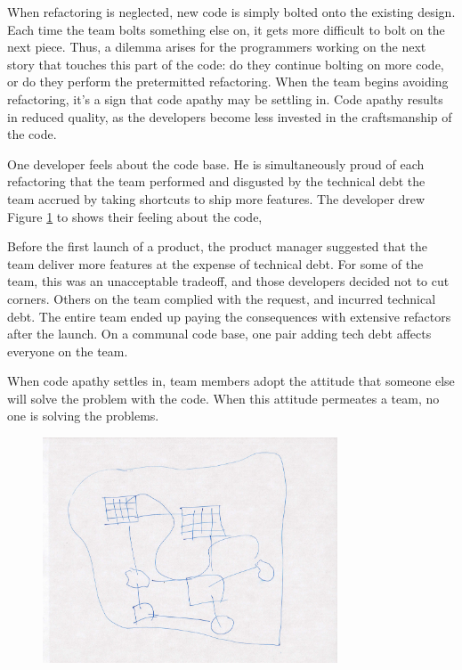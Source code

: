 When refactoring is neglected, new code is simply bolted onto the existing design. Each time the team bolts something else on, it gets more difficult to bolt on the next piece. Thus, a dilemma arises for the programmers working on the next story that touches this part of the code: do they continue bolting on more code, or do they perform the pretermitted refactoring. When the team begins avoiding refactoring, it's a sign that code apathy may be settling in. Code apathy results in reduced quality, as the developers become less invested in the craftsmanship of the code.

One developer feels  about the code base. He is simultaneously proud of each refactoring that the team performed and disgusted by the technical debt the team accrued by taking shortcuts to ship more features. The developer drew Figure \ref{Programmer1} to shows their feeling about the code, 

Before the first launch of a product, the product manager suggested that the team deliver more features at the expense of technical debt. For some of the team, this was an unacceptable tradeoff, and those developers decided not to cut corners. Others on the team complied with the request, and incurred technical debt. The entire team ended up paying the consequences with extensive refactors after the launch. On a communal code base, one pair adding tech debt affects everyone on the team.

When code apathy settles in, team members adopt the attitude that someone else will solve the problem with the code. When this attitude permeates a team, no one is solving the problems. 

\begin{figure}[t]
\centering
\includegraphics[width=3.45in]{CodeOwnership.jpg}
\caption{}
\label{Programmer1}
\end{figure}



